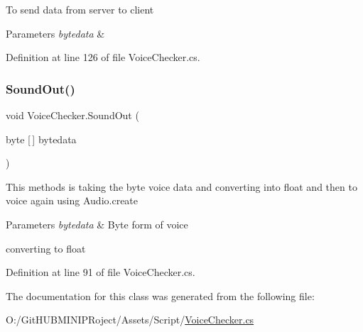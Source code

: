To send data from server to client 


\begin{DoxyParams}{Parameters}
{\em bytedata} & \\
\hline
\end{DoxyParams}


Definition at line 126 of file Voice\+Checker.\+cs.

\mbox{\label{class_voice_checker_aa61d463472d051565405e77c8e4bae55}} 
\subsubsection{\texorpdfstring{SoundOut()}{SoundOut()}}
{\footnotesize\ttfamily void Voice\+Checker.\+Sound\+Out (\begin{DoxyParamCaption}\item[{byte \mbox{[}$\,$\mbox{]}}]{bytedata }\end{DoxyParamCaption})}



This methods is taking the byte voice data and converting into float and then to voice again using Audio.\+create 


\begin{DoxyParams}{Parameters}
{\em bytedata} & Byte form of voice \\
\hline
\end{DoxyParams}
converting to float 

Definition at line 91 of file Voice\+Checker.\+cs.



The documentation for this class was generated from the following file\+:\begin{DoxyCompactItemize}
\item 
O\+:/\+Git\+H\+U\+B\+M\+I\+N\+I\+P\+Roject/\+Assets/\+Script/\mbox{\hyperlink{_voice_checker_8cs}{Voice\+Checker.\+cs}}\end{DoxyCompactItemize}
